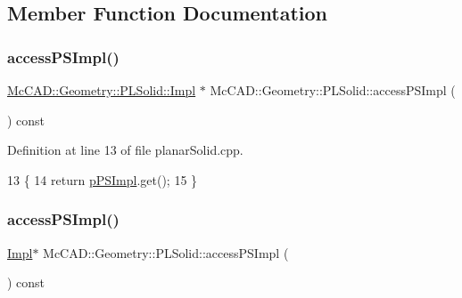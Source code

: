 \subsection{Member Function Documentation}
\mbox{\label{classMcCAD_1_1Geometry_1_1PLSolid_aea7b957208b17a48340cf97e1395f658}} 
\subsubsection{\texorpdfstring{access\+P\+S\+Impl()}{accessPSImpl()}\hspace{0.1cm}{\footnotesize\ttfamily [1/2]}}
{\footnotesize\ttfamily \hyperlink{classMcCAD_1_1Geometry_1_1PLSolid_1_1Impl}{Mc\+C\+A\+D\+::\+Geometry\+::\+P\+L\+Solid\+::\+Impl} $\ast$ Mc\+C\+A\+D\+::\+Geometry\+::\+P\+L\+Solid\+::access\+P\+S\+Impl (\begin{DoxyParamCaption}{ }\end{DoxyParamCaption}) const}



Definition at line 13 of file planar\+Solid.\+cpp.


\begin{DoxyCode}
13                                         \{
14   \textcolor{keywordflow}{return} \hyperlink{classMcCAD_1_1Geometry_1_1PLSolid_afdcf89bfac48acf8572e502b9b44d324}{pPSImpl}.get();
15 \}
\end{DoxyCode}
\mbox{\label{classMcCAD_1_1Geometry_1_1PLSolid_a6c79176fc7a126bea68fbc5ae82eb1d9}} 
\subsubsection{\texorpdfstring{access\+P\+S\+Impl()}{accessPSImpl()}\hspace{0.1cm}{\footnotesize\ttfamily [2/2]}}
{\footnotesize\ttfamily \hyperlink{classMcCAD_1_1Geometry_1_1PLSolid_1_1Impl}{Impl}$\ast$ Mc\+C\+A\+D\+::\+Geometry\+::\+P\+L\+Solid\+::access\+P\+S\+Impl (\begin{DoxyParamCaption}{ }\end{DoxyParamCaption}) const}

